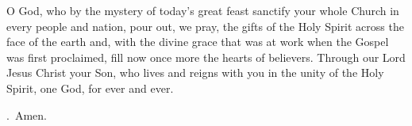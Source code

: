 \lettrine[lines=3]{O}{} God, who by the mystery of today’s great feast
sanctify your whole Church in every people and nation,
pour out, we pray, the gifts of the Holy Spirit
across the face of the earth
and, with the divine grace that was at work
when the Gospel was first proclaimed,
fill now once more the hearts of believers.
Through our Lord Jesus Christ your Son,
who lives and reigns with you in the unity of the Holy Spirit,
one God, for ever and ever.
\par \Rbar.~Amen.
